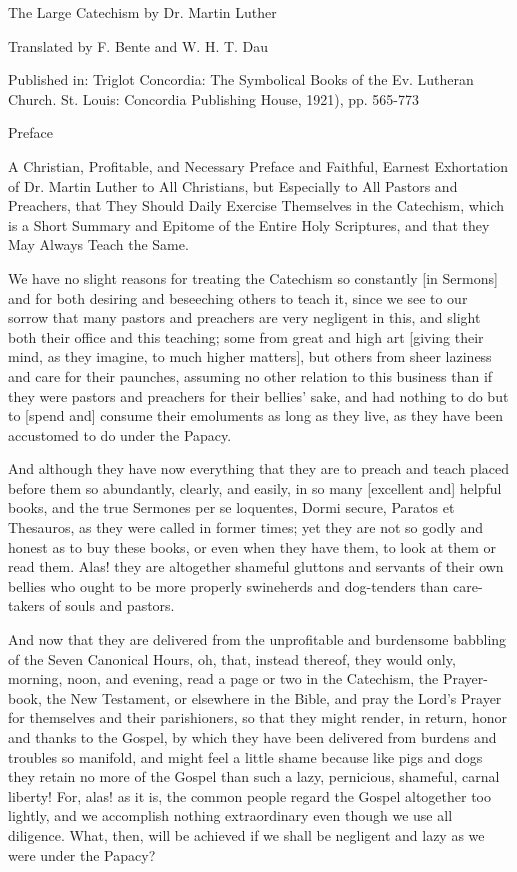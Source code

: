The Large Catechism by Dr. Martin Luther

Translated by F. Bente and W. H. T. Dau


Published in:
Triglot Concordia: The Symbolical Books of the Ev. Lutheran Church.
St. Louis: Concordia Publishing House, 1921), pp. 565-773

Preface

A Christian, Profitable, and Necessary Preface and Faithful, Earnest
Exhortation of Dr. Martin Luther to All Christians, but Especially to
All Pastors and Preachers, that They Should Daily Exercise Themselves
in the Catechism, which is a Short Summary and Epitome of the Entire
Holy Scriptures, and that they May Always Teach the Same.

We have no slight reasons for treating the Catechism so constantly [in
Sermons] and for both desiring and beseeching others to teach it, since
we see to our sorrow that many pastors and preachers are very negligent
in this, and slight both their office and this teaching; some from
great and high art [giving their mind, as they imagine, to much higher
matters], but others from sheer laziness and care for their paunches,
assuming no other relation to this business than if they were pastors
and preachers for their bellies' sake, and had nothing to do but to
[spend and] consume their emoluments as long as they live, as they have
been accustomed to do under the Papacy.


 And although they have now everything that they are to preach and
teach placed before them so abundantly, clearly, and easily, in so many
[excellent and] helpful books, and the true Sermones per se loquentes,
Dormi secure, Paratos et Thesauros, as they were called in former
times; yet they are not so godly and honest as to buy these books, or
even when they have them, to look at them or read them. Alas! they are
altogether shameful gluttons and servants of their own bellies who
ought to be more properly swineherds and dog-tenders than care-takers
of souls and pastors.

And now that they are delivered from the unprofitable and burdensome
babbling of the Seven Canonical Hours, oh, that, instead thereof, they
would only, morning, noon, and evening, read a page or two in the
Catechism, the Prayer-book, the New Testament, or elsewhere in the
Bible, and pray the Lord's Prayer for themselves and their
parishioners, so that they might render, in return, honor and thanks to
the Gospel, by which they have been delivered from burdens and troubles
so manifold, and might feel a little shame because like pigs and dogs
they retain no more of the Gospel than such a lazy, pernicious,
shameful, carnal liberty! For, alas! as it is, the common people regard
the Gospel altogether too lightly, and we accomplish nothing
extraordinary even though we use all diligence. What, then, will be
achieved if we shall be negligent and lazy as we were under the Papacy?


